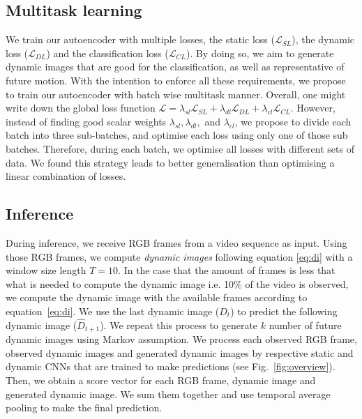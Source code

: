 \subsection{Multitask learning}
\label{sec.mtl}
We train our autoencoder with multiple losses, the static loss ($\mathcal{L}_{SL}$), the dynamic loss ($\mathcal{L}_{DL}$) and the classification loss ($\mathcal{L}_{CL}$). By doing so, we aim to generate dynamic images that are good for the classification, as well as representative of future motion. 
With the intention to enforce all these requirements, we propose to train our autoencoder with batch wise multitask manner. 
Overall, one might write down the global loss function $\mathcal{L} =  \lambda_{sl} \mathcal{L}_{SL} + \lambda_{dl} \mathcal{L}_{DL} + \lambda_{cl} \mathcal{L}_{CL}$. 
However, instead of finding good scalar weights $\lambda_{sl}, \lambda_{dl},$ and $\lambda_{cl}$, we propose to divide each batch into three sub-batches, and optimise each loss using only one of those sub batches. Therefore, during each batch, we optimise all losses with different sets of data. 
We found this strategy leads to better generalisation than optimising a linear combination of losses.

\subsection{Inference}
During inference, we receive RGB frames from a video sequence as input. Using those RGB frames, we compute \textit{dynamic images} following equation \ref{eq:di} with a window size length $T=10$. In the case that the amount of frames is less that what is needed to compute the dynamic image i.e. 10\% of the video is observed, we compute the dynamic image with the available frames according to equation~\ref{eq:di}.
We use the last dynamic image ($D_t$) to predict the following dynamic image ($\hat{D}_{t+1}$). 
We repeat this process to generate $k$ number of future dynamic images using Markov assumption.
We process each observed RGB frame, observed dynamic images and generated dynamic images by respective static and dynamic CNNs that are trained to make predictions (see Fig.~\ref{fig:overview}). 
Then, we obtain a score vector for each RGB frame, dynamic image and generated dynamic image.
We sum them together and use temporal average pooling to make the final prediction. 
